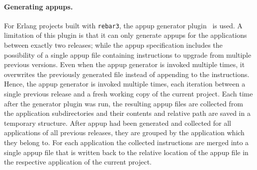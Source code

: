 {\paragraph{Generating \acrshort{appup}s.} For Erlang projects built with \lstinline|rebar3|, the \acrlong{appup} generator plugin~\cite{rebar3appup} is used. A limitation of this plugin is that it can only generate \acrshort{appup}s for the applications between exactly two releases; while the \acrshort{appup} specification includes the possibility of a single \acrshort{appup} file containing instructions to upgrade from multiple previous versions. Even when the \acrshort{appup} generator is invoked multiple times, it overwrites the previously generated file instead of appending to the instructions. Hence, the \acrshort{appup} generator is invoked multiple times, each iteration between a single previous release and a fresh working copy of the current project. Each time after the generator plugin was run, the resulting \acrshort{appup} files are collected from the application subdirectories and their contents and relative path are saved in a temporary structure. After \acrlong{appup} had been generated and collected for all applications of all previous releases, they are grouped by the application which they belong to. For each application the collected instructions are merged into a single \acrshort{appup} file that is written back to the relative location of the \acrshort{appup} file in the respective application of the current project.

}
